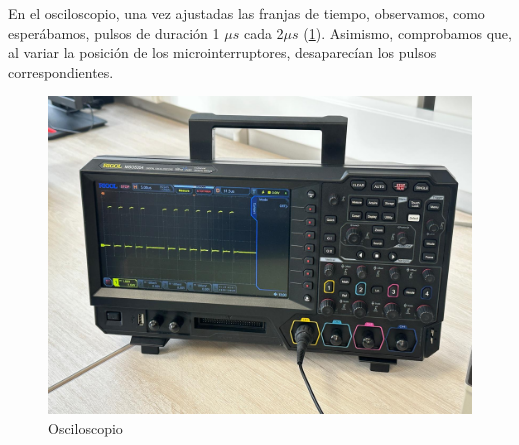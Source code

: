 En el osciloscopio, una vez ajustadas las franjas de tiempo, observamos, como esperábamos, pulsos de duración 1 $\mu s$ cada 2$\mu s$ (\cref{Osciloscopio}). Asimismo, comprobamos que, al variar la posición de los microinterruptores, desaparecían los pulsos correspondientes.

\begin{figure}[!htb]
    \centering
    \includegraphics[width=0.5\linewidth]{include/figures/Osciloscopio.jpg}
    \caption{Osciloscopio}
    \label{Osciloscopio}
\end{figure}
